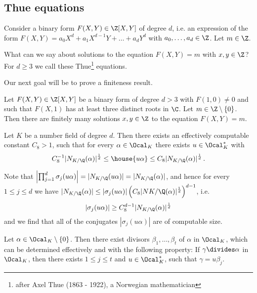 \subsection*{Thue equations}

Consider a binary form \( F(X,Y) \in \Z[X,Y] \) of degree \( d \), i.e. an expression of the form \( F(X,Y) = a_0 X^d + a_1 X^{d-1}Y + \dots + a_d Y^d \) with \( a_0, \dotsc, a_d \in \Z \).
Let \( m \in \Z \).

\begin{frage*}
	What can we say about solutions to the equation \( F(X,Y) = m \) with \( x,y \in \Z \)?
	For \( d \geq 3 \) we call these Thue\footnote{after Axel Thue (1863 - 1922), a Norwegian mathematician} equations.
\end{frage*}

Our next goal will be to prove a finiteness result.

\begin{thm}\label{thm:5.7}
	Let \( F(X,Y) \in \Z[X,Y] \) be a binary form of degree \( d>3 \) with \( F(1,0) \neq 0 \) and such that \( F(X,1) \) has at least three distinct roots in \( \C \).
	Let \( m \in \Z \setminus \{0\} \).
	Then there are finitely many solutions \( x,y \in \Z \) to the equation \( F(X,Y) = m \).
\end{thm}

\begin{lem}
	Let \( K \) be a number field of degree \( d \).
	Then there exists an effectively computable constant \( C_8 > 1 \), such that for every \( \alpha \in \Ocal_K \) there exists \( u \in \Ocal_K^* \) with
	\[ C_8^{-1} |N_{K/\Q}(\alpha)|^\frac{1}{d} \leq \house{u \alpha} \leq C_8 |N_{K/\Q}(\alpha)|^\frac{1}{d} \,. \]
\end{lem}

\begin{rem*}
	Note that \( \left| \prod_{j=1}^{d} \sigma_j (u\alpha) \right| = |N_{K/\Q}(u\alpha)| = |N_{K/\Q}(\alpha)| \), and hence for every \( 1 \leq j \leq d \) we have \( |N_{K/\Q}(\alpha)| \leq |\sigma_j(u\alpha)| \left(C_8 |N{K/\Q}(\alpha)|^\frac{1}{d} \right)^{d-1} \), i.e.
	\[ |\sigma_j(u\alpha)| \geq C_8^{d-1} |N_{K/\Q}(\alpha)|^\frac{1}{d} \]
	and we find that all of the conjugates \( |\sigma_j(u\alpha)| \) are of computable size.
\end{rem*}

\begin{lem}
	Let \( \alpha \in \Ocal_K \setminus \{0\} \).
	Then there exist divisors \( \beta_1, \dotsc, \beta_t \) of \( \alpha \) in \( \Ocal_K \), which can be determined effectively and with the following property:
	If \( \gamma \divides \alpha \) in \( \Ocal_K \), then there exists \( 1 \leq j \leq t \) and \( u \in \Ocal_K^* \), such that \( \gamma = u \beta_j \).
\end{lem}

